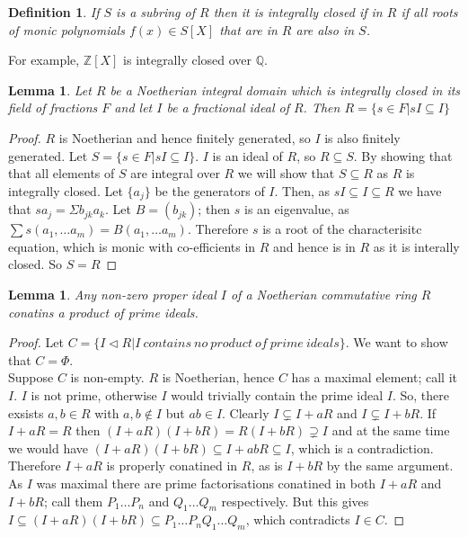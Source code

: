 \documentclass[a4paper,10pt]{article}
\newtheorem{defn}[thm]{Definition}
\newtheorem{lem}[thm]{Lemma}
\begin{document}
\begin{defn}
If $S$ is a subring of $R$ then it is integrally closed if in $R$ if all roots of monic polynomials $f(x)\in S[X]$ that are in $R$ are also in $S$.
\end{defn}

 For example, $\mathbb{Z}[X]$ is integrally closed over $\mathbb{Q}$.

\begin{lem}
Let $R$ be a Noetherian integral domain which is integrally closed in its field of fractions $F$ and let $I$ be a fractional ideal of $R$. Then $R=\{ s\in F|sI\subseteq I\}$
\end{lem}
\begin{proof}
$R$ is Noetherian and hence finitely generated, so $I$ is also finitely generated. Let $S=\{s\in F|sI\subseteq I\}$. $I$ is an ideal of $R$, so $R\subseteq S$. By showing that that all elements of $S$ are integral over $R$ we will show that $S\subseteq R$ as $R$ is integrally closed. Let $\{a_{j}\}$ be the generators of $I$. Then, as $sI\subseteq I\subseteq R$ we have that $sa_{j}=\Sigma b_{jk}a_{k}$. Let $B=(b_{jk})$; then $s$ is an eigenvalue, as $\sum s(a_{1},\ldots a_{m})= B(a_{1},\ldots a_{m})$. Therefore $s$ is a root of the characterisitc equation, which is monic with co-efficients in $R$ and hence is in $R$ as it is interally closed. So $S=R$
\end{proof}
\begin{lem}
Any non-zero proper ideal $I$ of a Noetherian commutative ring $R$ conatins a product of prime ideals.
\end{lem}
\begin{proof}
Let $C=\{I\triangleleft R|I \ contains \ no \ product \ of \ prime \ ideals\}$. We want to show that $C=\Phi$.
\\ Suppose $C$ is non-empty. $R$ is Noetherian, hence $C$ has a maximal element; call it $I$. $I$ is not prime, otherwise $I$ would trivially contain the prime ideal $I$. So, there exsists $a,b\in R$ with $a,b\notin I$ but $ab\in I$. Clearly $I\subsetneq I+aR$ and $I\subsetneq I+bR$. If $I+aR=R$ then $(I+aR)(I+bR)=R(I+bR)\supsetneq I$ and at the same time we would have $(I+aR)(I+bR)\subseteq I+abR\subseteq I$, which is a contradiction.
\\ Therefore $I+aR$ is properly conatined in $R$, as is $I+bR$ by the same argument. As $I$ was maximal there are prime factorisations conatined in both $I+aR$ and $I+bR$; call them $P_{1}\ldots P_{n}$ and $Q_{1}\ldots Q_{m}$ respectively. But this gives $I\subseteq (I+aR)(I+bR)\subseteq P_{1}\ldots P_{n}Q_{1}\ldots Q_{m}$, which contradicts $I\in C$.
\end{proof}
\end{document}
